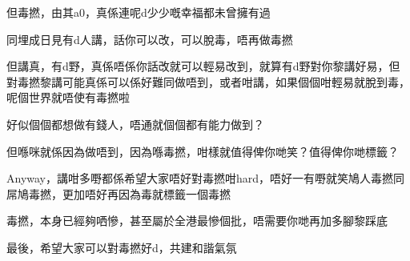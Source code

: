 但毒撚，由其a0，真係連呢d少少嘅幸福都未曾擁有過

同埋成日見有d人講，話你可以改，可以脫毒，唔再做毒撚

但講真，有d野，真係唔係你話改就可以輕易改到，就算有d野對你黎講好易，但對毒撚黎講可能真係可以係好難同做唔到，或者咁講，如果個個咁輕易就脫到毒，呢個世界就唔使有毒撚啦

好似個個都想做有錢人，唔通就個個都有能力做到？

但喺咪就係因為做唔到，因為喺毒撚，咁樣就值得俾你哋笑？值得俾你哋標籤？

Anyway，講咁多嘢都係希望大家唔好對毒撚咁hard，唔好一有嘢就笑鳩人毒撚同屌鳩毒撚，更加唔好再因為毒就標籤一個毒撚

毒撚，本身已經夠哂慘，甚至屬於全港最慘個批，唔需要你哋再加多腳黎踩底

最後，希望大家可以對毒撚好d，共建和諧氣氛

